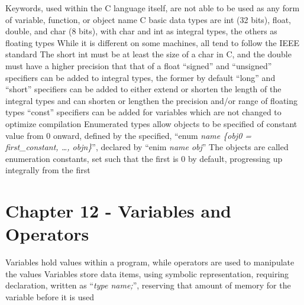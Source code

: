 \documentclass[11 pt, twoside]{article}
\newenvironment{outline*}
{
	\begin{outline}[enumerate]
	}
	{\end{outline}
}
\begin{document}
\begin{outline*}
\2 Keywords, used within the C language itself, are not able to be used as any form of variable, function, or object name
\1 C basic data types are int (32 bits), float, double, and char (8 bits), with char and int as integral types, the others as floating types
\2 While it is different on some machines, all tend to follow the IEEE standard
\2 The short int must be at least the size of a char in C, and the double must have a higher precision that that of a float
\2 ``signed'' and ``unsigned'' specifiers can be added to integral types, the former by default
\2 ``long'' and ``short'' specifiers can be added to either extend or shorten the length of the integral types and can shorten or lengthen the precision and/or range of floating types
\2 ``const'' specifiers can be added for variables which are not changed to optimize compilation
\1 Enumerated types allow objects to be specified of constant value from 0 onward, defined by the specified, ``enum \textit{name \{obj0 = first\_constant, \dots, objn\}}'', declared by ``enim \textit{name obj}''
\2 The objects are called enumeration constants, set such that the first is 0 by default, progressing up integrally from the first
\end{outline*}
\section{Chapter 12 - Variables and Operators}
\begin{outline*}
\1 Variables hold values within a program, while operators are used to manipulate the values
\2 Variables store data items, using symbolic representation, requiring declaration, written as ``\textit{type name;}'', reserving that amount of memory for the variable before it is used
\2 
\end{outline*}
\end{document}
